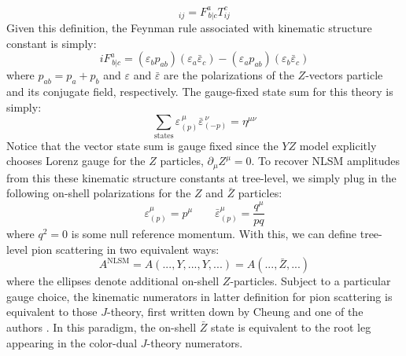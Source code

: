 \documentclass[11pt,letter]{article}
\def\be{\begin{equation}}
\begin{document}
\begin{equation}
[T^a,T^b]_{ij}= F^{a}_{\,b|c}T^c_{ij}
\end{equation}
Given this definition, the Feynman rule associated with kinematic structure constant is simply:
\be\label{eq:FeynmanRuleXZZ}
i F^{a}_{\,b|c} = (\varepsilon_b p_{ab})(\varepsilon_a\bar{\varepsilon}_c) - (\varepsilon_a p_{ab})(\varepsilon_b\bar{\varepsilon}_c) 
\end{equation}
where $p_{ab}=p_a+p_b$ and $\varepsilon$ and $\bar{\varepsilon}$ are the polarizations of the $Z$-vectors particle and its conjugate field, respectively. The gauge-fixed state sum for this theory is simply:
\begin{equation}
\sum_{\text{states}} \varepsilon^{\,\mu}_{(p)}\bar{\varepsilon}^{\,\nu}_{(-p)} = \eta^{\mu\nu}
\end{equation}
Notice that the vector state sum is gauge fixed since the $YZ$ model explicitly chooses Lorenz gauge for the $Z$ particles, $\partial_\mu Z^\mu=0$. To recover NLSM amplitudes from this these kinematic structure constants at tree-level, we simply plug in the following on-shell polarizations for the $Z$ and $\bar{Z}$ particles:
\be\label{eq:onShellZStates}
\varepsilon^\mu_{(p)} = p^\mu \qquad \bar{\varepsilon}^\mu_{(p)} = \frac{q^\mu}{pq}
\end{equation}
where $q^2=0$ is some null reference momentum. With this, we can define tree-level pion scattering in two equivalent ways:
\begin{equation}
A^{\text{NLSM}} = A(...,Y,...,Y,...) = A(...,\bar{Z},...) 
\end{equation}
where the ellipses denote additional on-shell $Z$-particles. Subject to a particular gauge choice, the kinematic numerators in latter definition for pion scattering is equivalent to those $J$-theory, first written down by Cheung and one of the authors \cite{Cheung:2021zvb}. In this paradigm, the on-shell $\bar{Z}$ state is equivalent to the root leg appearing in the color-dual $J$-theory numerators. 
\end{document}
